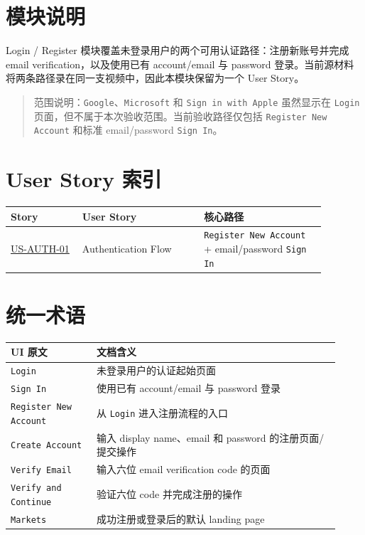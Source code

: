 \section{模块说明}
Login /\allowbreak{} Register 模块覆盖未登录用户的两个可用认证路径：注册新账号并完成 email verification，以及使用已有 account/\allowbreak{}email 与 password 登录。当前源材料将两条路径录在同一支视频中，因此本模块保留为一个 User Story。
\begin{quote}\small 范围说明：\texttt{Google}、\texttt{Microsoft} 和 \texttt{Sign in with Apple} 虽然显示在 \texttt{Login} 页面，但不属于本次验收范围。当前验收路径仅包括 \texttt{Register New Account} 和标准 email/\allowbreak{}password \texttt{Sign In}。\end{quote}
\section{User Story 索引}
\begingroup
\small
\begin{longtable}{L{0.20\linewidth}L{0.34\linewidth}L{0.34\linewidth}}
\toprule
\textbf{Story} & \textbf{User Story} & \textbf{核心路径} \\
\midrule
\hyperlink{us-auth-01}{US-AUTH-01} & Authentication Flow & \texttt{Register New Account} + email/\allowbreak{}password \texttt{Sign In} \\
\bottomrule
\end{longtable}
\endgroup
\section{统一术语}
\begingroup
\small
\begin{longtable}{L{0.24\linewidth}L{0.68\linewidth}}
\toprule
\textbf{UI 原文} & \textbf{文档含义} \\
\midrule
\texttt{Login} & 未登录用户的认证起始页面 \\
\texttt{Sign In} & 使用已有 account/\allowbreak{}email 与 password 登录 \\
\texttt{Register New Account} & 从 \texttt{Login} 进入注册流程的入口 \\
\texttt{Create Account} & 输入 display name、email 和 password 的注册页面/\allowbreak{}提交操作 \\
\texttt{Verify Email} & 输入六位 email verification code 的页面 \\
\texttt{Verify and Continue} & 验证六位 code 并完成注册的操作 \\
\texttt{Markets} & 成功注册或登录后的默认 landing page \\
\bottomrule
\end{longtable}
\endgroup
\prdhr
\hypertarget{us-auth-01}{}
